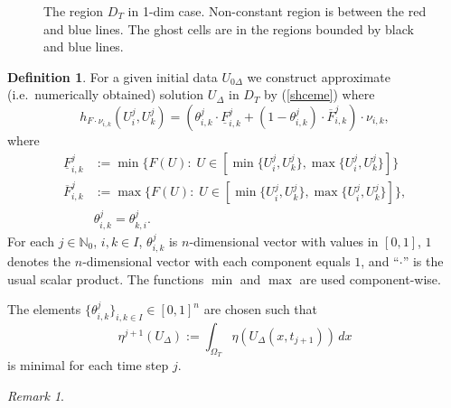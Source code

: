 \documentclass[11pt,a4paper,reqno]{amsart}
\theoremstyle{plain}
\theoremstyle{definition}
\newtheorem{definition}{Definition}[section]
\theoremstyle{remark}
\newtheorem{remark}{Remark}[section]
\numberwithin{equation}{section}
\begin{document}
{\begin{figure}[h]
\vspace*{-0.4cm}
\caption{\small The region $D_{T}$ in 1-dim case. Non-constant region is 
between the red and blue lines. The ghost cells are in the regions bounded by black and blue lines.}
\end{figure}
\begin{definition} \label{defscheme}
For a given initial data $U_{0\Delta}$ we construct approximate 
(i.e.\ numerically obtained) solution 
$U_{\Delta}$ in $D_{T}$ by (\ref{shceme}) where
\begin{equation} \label{nflux}
h_{F\cdot \nu_{i,k}}(U_{i}^{j},U_{k}^{j})
=(\theta_{i,k}^{j} \cdot \underline{F}_{i,k}^{j}+(1-\theta_{i,k}^{j})\cdot
\overline{F}_{i,k}^{j})\cdot \nu_{i,k}, 
\end{equation}
where 
\[
\begin{split}
\underline{F}_{i,k}^{j}&:=\min\{F(U):\; U\in [\min\{ U_{i}^{j},
U_{k}^{j}\},\max\{U_{i}^{j}, U_{k}^{j}\}]\}\\
\overline{F}_{i,k}^{j}&:=\max\{F(U):\; U\in [\min\{ U_{i}^{j},
U_{k}^{j}\},\max\{U_{i}^{j}, U_{k}^{j}\}]\},
\\ & \theta_{i,k}^{j}=\theta_{k,i}^{j}.
\end{split}
\] 	
For each $j\in \mathbb{N}_{0}$, $i,k\in I$, 
$\theta_{i,k}^{j}$ is $n$-dimensional vector with values in $[0,1]$, 
$1$ denotes the $n$-dimensional vector with each component equals $1$, 
and ``$\cdot$'' is the usual scalar product. 
The functions $\min$ and $\max$ are used component-wise.
	
The elements $\{\theta_{i,k}^{j}\}_{i,k\in I}\in [0,1]^{n}$ are chosen such that 
\[\eta^{j+1}(U_{\Delta}):=\int_{\Omega_{T}}\eta(U_{\Delta}(x,t_{j+1}))\,dx\] 
is minimal for each time step $j$.
\end{definition}
\begin{remark}


\end{remark}}
\end{document}
